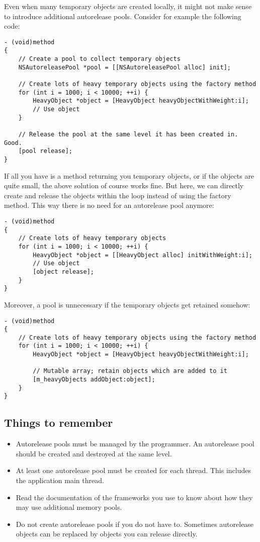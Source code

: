 Even when many temporary objects are created locally, it might not make sense to introduce additional autorelease pools. Consider for example the following code:
\begin{lstlisting}[frame=single]
- (void)method
{
    // Create a pool to collect temporary objects
    NSAutoreleasePool *pool = [[NSAutoreleasePool alloc] init];
    
    // Create lots of heavy temporary objects using the factory method
    for (int i = 1000; i < 10000; ++i) {
        HeavyObject *object = [HeavyObject heavyObjectWithWeight:i];
        // Use object
    }
    
    // Release the pool at the same level it has been created in. Good.
    [pool release];
}
\end{lstlisting}
If all you have is a method returning you temporary objects, or if the objects are quite small, the above solution of course works fine. But here, we can directly create and release the objects within the loop instead of using the factory method. This way there is no need for an autorelease pool anymore:
\begin{lstlisting}[frame=single]
- (void)method
{
    // Create lots of heavy temporary objects
    for (int i = 1000; i < 10000; ++i) {
        HeavyObject *object = [[HeavyObject alloc] initWithWeight:i];
        // Use object
        [object release];
    }
}
\end{lstlisting}
Moreover, a pool is unnecessary if the temporary objects get retained somehow:
\begin{lstlisting}[frame=single]
- (void)method
{
    // Create lots of heavy temporary objects using the factory method
    for (int i = 1000; i < 10000; ++i) {
        HeavyObject *object = [HeavyObject heavyObjectWithWeight:i];
        
        // Mutable array; retain objects which are added to it
        [m_heavyObjects addObject:object];
    }
}
\end{lstlisting}

\subsection{Things to remember}
\begin{itemize}
\item Autorelease pools must be managed by the programmer. An autorelease pool should be created and destroyed at the same level.
\item At least one autorelease pool must be created for each thread. This includes the application main thread.
\item Read the documentation of the frameworks you use to know about how they may use additional memory pools.
\item Do not create autorelease pools if you do not have to. Sometimes autorelease objects can be replaced by objects you can release directly.
\end{itemize}

